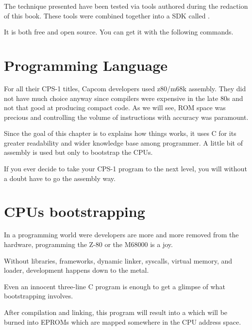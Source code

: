 The technique presented have been tested via tools authored during the redaction of this book. These tools were combined together into a SDK called . 

It is both free and open source. You can get it with the following commands.






\section{Programming Language}
For all their CPS-1 titles, Capcom developers used z80/m68k assembly. They did not have much choice anyway since compilers were expensive in the late 80s and not that good at producing compact code. As we will see, ROM space was precious and controlling the volume of instructions with accuracy was paramount.

Since the goal of this chapter is to explains how things works, it uses C for its greater readability and wider knowledge base among programmer. A little bit of assembly is used but only to bootstrap the CPUs.

If you ever decide to take your CPS-1 program to the next level, you will without a doubt have to go the assembly way.
	
\section{CPUs bootstrapping}
In a programming world were developers are more and more removed from the hardware, programming the Z-80 or the M68000 is a joy.

Without libraries, frameworks, dynamic linker, syscalls, virtual memory, and loader, development happens down to the metal.

Even an innocent three-line C program is enough to get a glimpse of what bootstrapping involves.



After compilation and linking, this program will result into a  which will be burned into EPROMs which are mapped somewhere in the CPU address space.


